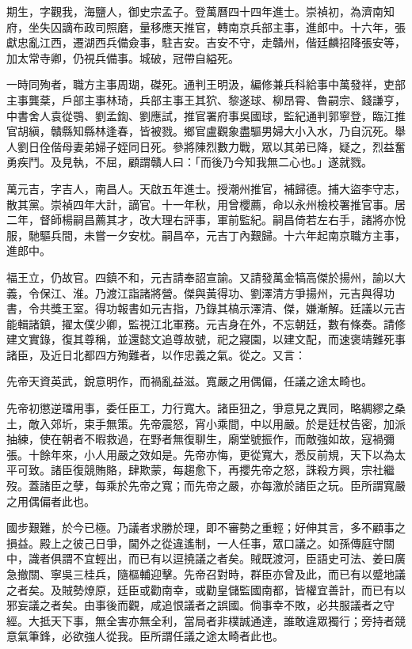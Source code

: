 \begin{pinyinscope}
期生，字觀我，海鹽人，御史宗孟子。登萬曆四十四年進士。崇禎初，為濟南知府，坐失囚謫布政司照磨，量移應天推官，轉南京兵部主事，進郎中。十六年，張獻忠亂江西，遷湖西兵備僉事，駐吉安。吉安不守，走贛州，偕廷麟招降張安等，加太常寺卿，仍視兵備事。城破，冠帶自縊死。

一時同殉者，職方主事周瑚，磔死。通判王明汲，編修兼兵科給事中萬發祥，吏部主事龔棻，戶部主事林琦，兵部主事王其狖、黎遂球、柳昂霄、魯嗣宗、錢謙亨，中書舍人袁從鶚、劉孟鍧、劉應試，推官署府事吳國球，監紀通判郭寧登，臨江推官胡縝，贛縣知縣林逢春，皆被戮。鄉官盧觀象盡驅男婦大小入水，乃自沉死。舉人劉日佺偕母妻弟婦子姪同日死。參將陳烈數力戰，眾以其弟已降，疑之，烈益奮勇疾鬥。及見執，不屈，顧謂贛人曰：「而後乃今知我無二心也。」遂就戮。

萬元吉，字吉人，南昌人。天啟五年進士。授潮州推官，補歸德。捕大盜李守志，散其黨。崇禎四年大計，謫官。十一年秋，用曾櫻薦，命以永州檢校署推官事。居二年，督師楊嗣昌薦其才，改大理右評事，軍前監紀。嗣昌倚若左右手，諸將亦悅服，馳驅兵間，未嘗一夕安枕。嗣昌卒，元吉丁內艱歸。十六年起南京職方主事，進郎中。

福王立，仍故官。四鎮不和，元吉請奉詔宣諭。又請發萬金犒高傑於揚州，諭以大義，令保江、淮。乃渡江詣諸將營。傑與黃得功、劉澤清方爭揚州，元吉與得功書，令共獎王室。得功報書如元吉指，乃錄其槁示澤清、傑，嫌漸解。廷議以元吉能輯諸鎮，擢太僕少卿，監視江北軍務。元吉身在外，不忘朝廷，數有條奏。請修建文實錄，復其尊稱，並還懿文追尊故號，祀之寢園，以建文配，而速褒靖難死事諸臣，及近日北都四方殉難者，以作忠義之氣。從之。又言：

先帝天資英武，銳意明作，而禍亂益滋。寬嚴之用偶偏，任議之途太畸也。

先帝初懲逆璫用事，委任臣工，力行寬大。諸臣狃之，爭意見之異同，略綢繆之桑土，敵入郊圻，束手無策。先帝震怒，宵小乘間，中以用嚴。於是廷杖告密，加派抽練，使在朝者不暇救過，在野者無復聊生，廟堂號振作，而敵強如故，寇禍彌張。十餘年來，小人用嚴之效如是。先帝亦悔，更從寬大，悉反前規，天下以為太平可致。諸臣復競賄賂，肆欺蒙，每趨愈下，再攖先帝之怒，誅殺方興，宗社繼歿。蓋諸臣之孽，每乘於先帝之寬；而先帝之嚴，亦每激於諸臣之玩。臣所謂寬嚴之用偶偏者此也。

國步艱難，於今已極。乃議者求勝於理，即不審勢之重輕；好伸其言，多不顧事之損益。殿上之彼己日爭，閫外之從違遙制，一人任事，眾口議之。如孫傳庭守關中，識者俱謂不宜輕出，而已有以逗撓議之者矣。賊既渡河，臣語史可法、姜曰廣急撤關、寧吳三桂兵，隨樞輔迎擊。先帝召對時，群臣亦曾及此，而已有以蹙地議之者矣。及賊勢燎原，廷臣或勸南幸，或勸皇儲監國南都，皆權宜善計，而已有以邪妄議之者矣。由事後而觀，咸追恨議者之誤國。倘事幸不敗，必共服議者之守經。大抵天下事，無全害亦無全利，當局者非樸誠通達，誰敢違眾獨行；旁持者競意氣筆鋒，必欲強人從我。臣所謂任議之途太畸者此也。


\end{pinyinscope}
